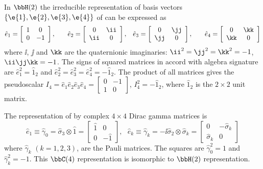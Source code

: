 \begin{example}
In $\bbH(2)$ the irreducible representation of basis vectors
$\{\e{1},\e{2},\e{3},\e{4}\}$ of  can be expressed as
\[\begin{split}
&\hat{e}_1=\left[\begin{array}{cc}1&0\\0&-1\end{array}\right],\quad
&\hat{e}_2=\left[\begin{array}{cc}0&\ii\\
\ii&0\end{array}\right],\quad
&\hat{e}_3=\left[\begin{array}{cc}0&\jj\\
\jj&0\end{array}\right],\quad
&\hat{e}_4=\left[\begin{array}{cc}0&\kk\\
\kk&0\end{array}\right]
\end{split}\]
where $\ii$, $\jj$ and $\kk$ are the quaternionic imaginaries:
$\ii^2=\jj^2=\kk^2=-1$, $\ii\jj\kk=-1$. The signs of squared
matrices in accord with  algebra signature are
$\hat{e}_1^2=\hat{1}_2$ and
$\hat{e}_2^2=\hat{e}_3^2=\hat{e}_4^2=-\hat{1}_2$. The product of
all matrices gives the pseudoscalar
$I_4=\hat{e}_1\hat{e}_2\hat{e}_3\hat{e}_4=\left[\begin{smallmatrix}0&-1\\1&0\end{smallmatrix}\right]$,
$I_4^2=-\hat{1}_2$, where  $\hat{1}_2$ is the $2\times 2$ unit
matrix.

The representation of  by complex $4\times 4$ Dirac gamma
matrices is
\[
\hat{e}_1\equiv\hat{\gamma}_0=\hat{\sigma}_3\otimes\hat{1}=\left[
\begin{array}{cc}
\hat{1} & 0 \\
0 & -\hat{1}
\end{array}
\right], \ \ \
\hat{e}_k\equiv\hat{\gamma}_k=-\ii\hat{\sigma}_2\otimes\hat{\sigma}_k=\left[
\begin{array}{cc}
0 & -\hat{\sigma}_k  \\
\hat{\sigma}_k & 0
\end{array}
\right]
\]
where $\hat{\gamma}_k$ $(k=1,2,3)$, are the Pauli matrices. The
squares  are $\hat{\gamma}_0^2=1$ and $\hat{\gamma}_k^2=-1$. This
$\bbC(4)$  representation is isomorphic  to $\bbH(2)$
representation.
\end{example}

